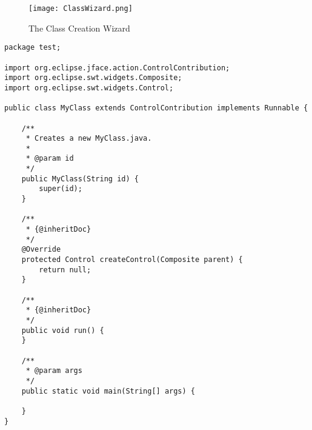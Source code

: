 \begin{figure}[ClassWizard]
  \centering
  \texttt{[image: ClassWizard.png]}
  \caption[The Class Creation Wizard]%
  {The Class Creation Wizard\protect\footnotemark}
  \label{fig:ClassWizard}
\end{figure}

\lstset{
  language=Java,
}
\begin{lstlisting}[caption={Code generated by the wizard},label={fig:classCreationGenerated}]
package test;

import org.eclipse.jface.action.ControlContribution;
import org.eclipse.swt.widgets.Composite;
import org.eclipse.swt.widgets.Control;

public class MyClass extends ControlContribution implements Runnable {

    /**
     * Creates a new MyClass.java.
     * 
     * @param id
     */
    public MyClass(String id) {
        super(id);
    }

    /**
     * {@inheritDoc}
     */
    @Override
    protected Control createControl(Composite parent) {
        return null;
    }

    /**
     * {@inheritDoc}
     */
    public void run() {
    }

    /**
     * @param args
     */
    public static void main(String[] args) {

    }
}
\end{lstlisting}


